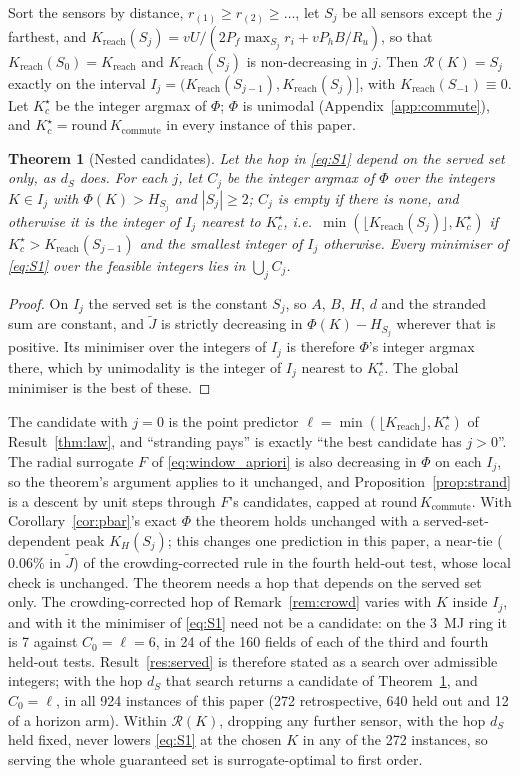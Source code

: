 \documentclass[journal,outdir=./]{IEEEtran}
\newtheorem{theorem}{Theorem}
\newcommand{\Kr}{K_{\mathrm{reach}}}
\newcommand{\Kc}{K_{\mathrm{commute}}}
\newcommand{\Pf}{P_{f}}
\newcommand{\Ph}{P_{h}}
\newcommand{\Ru}{R_u}
\begin{document}
Sort the sensors by distance, $r_{(1)}\ge r_{(2)}\ge\dots$, let $S_j$ be all sensors except the $j$ farthest, and $\Kr(S_j)=vU/(2\Pf\max_{S_j}r_i+v\Ph B/\Ru)$, so that $\Kr(S_0)=\Kr$ and $\Kr(S_j)$ is non-decreasing in $j$. Then $\mathcal R(K)=S_j$ exactly on the interval $I_j=(\Kr(S_{j-1}),\Kr(S_j)]$, with $\Kr(S_{-1})\equiv0$. Let $K_c^{\star}$ be the integer argmax of $\Phi$; $\Phi$ is unimodal (Appendix~\ref{app:commute}), and $K_c^{\star}=\mathrm{round}\,\Kc$ in every instance of this paper.

\begin{theorem}[Nested candidates]\label{thm:nested}
Let the hop in \eqref{eq:S1} depend on the served set only, as $d_S$ does. For each $j$, let $C_j$ be the integer argmax of $\Phi$ over the integers $K\in I_j$ with $\Phi(K)>H_{S_j}$ and $|S_j|\ge2$; $C_j$ is empty if there is none, and otherwise it is the integer of $I_j$ nearest to $K_c^{\star}$, i.e.\ $\min(\lfloor\Kr(S_j)\rfloor,K_c^{\star})$ if $K_c^{\star}>\Kr(S_{j-1})$ and the smallest integer of $I_j$ otherwise. Every minimiser of \eqref{eq:S1} over the feasible integers lies in $\bigcup_jC_j$.
\end{theorem}
\begin{proof}
On $I_j$ the served set is the constant $S_j$, so $A$, $B$, $H$, $d$ and the stranded sum are constant, and $\tilde J$ is strictly decreasing in $\Phi(K)-H_{S_j}$ wherever that is positive. Its minimiser over the integers of $I_j$ is therefore $\Phi$'s integer argmax there, which by unimodality is the integer of $I_j$ nearest to $K_c^{\star}$. The global minimiser is the best of these.
\end{proof}
The candidate with $j=0$ is the point predictor $\ell=\min(\lfloor\Kr\rfloor,K_c^{\star})$ of Result~\ref{thm:law}, and ``stranding pays'' is exactly ``the best candidate has $j>0$''. The radial surrogate $F$ of \eqref{eq:window_apriori} is also decreasing in $\Phi$ on each $I_j$, so the theorem's argument applies to it unchanged, and Proposition~\ref{prop:strand} is a descent by unit steps through $F$'s candidates, capped at $\mathrm{round}\,\Kc$. With Corollary~\ref{cor:pbar}'s exact $\Phi$ the theorem holds unchanged with a served-set-dependent peak $K_H(S_j)$; this changes one prediction in this paper, a near-tie ($0.06\%$ in $\tilde J$) of the crowding-corrected rule in the fourth held-out test, whose local check is unchanged. The theorem needs a hop that depends on the served set only. The crowding-corrected hop of Remark~\ref{rem:crowd} varies with $K$ inside $I_j$, and with it the minimiser of \eqref{eq:S1} need not be a candidate: on the 3~MJ ring it is 7 against $C_0=\ell=6$, in 24 of the 160 fields of each of the third and fourth held-out tests. Result~\ref{res:served} is therefore stated as a search over admissible integers; with the hop $d_S$ that search returns a candidate of Theorem~\ref{thm:nested}, and $C_0=\ell$, in all 924 instances of this paper (272 retrospective, 640 held out and 12 of a horizon arm). Within $\mathcal R(K)$, dropping any further sensor, with the hop $d_S$ held fixed, never lowers \eqref{eq:S1} at the chosen $K$ in any of the 272 instances, so serving the whole guaranteed set is surrogate-optimal to first order.
\end{document}
